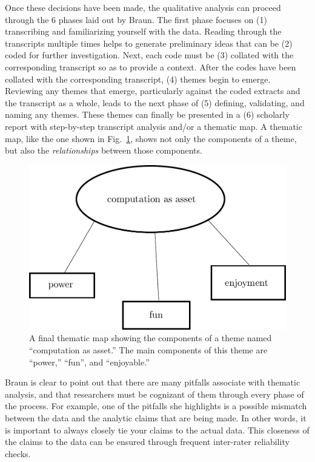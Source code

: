 \documentclass{msuphddissertation}
\begin{document}
\begin{doublespace}
Once these decisions have been made, the qualitative analysis can proceed through the $6$ phases laid out by Braun.  The first phase focuses on (1) transcribing and familiarizing yourself with the data.  Reading through the transcripts multiple times helps to generate preliminary ideas that can be (2) coded for further investigation.  Next, each code must be (3) collated with the corresponding transcript so as to provide a context.  After the codes have been collated with the corresponding transcript, (4) themes begin to emerge.  Reviewing any themes that emerge, particularly against the coded extracts and the transcript as a whole, leads to the next phase of (5) defining, validating, and naming any themes.  These themes can finally be presented in a (6) scholarly report with step-by-step transcript analysis and/or a thematic map.  A thematic map, like the one shown in Fig.~\ref{CH2:Map}, shows not only the components of a theme, but also the \textit{relationships} between those components.

\begin{figure}\center
\includegraphics[scale=0.60]{images/CH2Map.pdf}
\caption{A final thematic map showing the components of a theme named ``computation as asset.''  The main components of this theme are ``power,'' ``fun'', and ``enjoyable.''}\label{CH2:Map}
\end{figure}

Braun is clear to point out that there are many pitfalls associate with thematic analysis, and that researchers must be cognizant of them through every phase of the process.  For example, one of the pitfalls she highlights is a possible mismatch between the data and the analytic claims that are being made.  In other words, it is important to always closely tie your claims to the actual data.  This closeness of the claims to the data can be ensured through frequent inter-rater reliability checks.


\end{doublespace}
\end{document}
